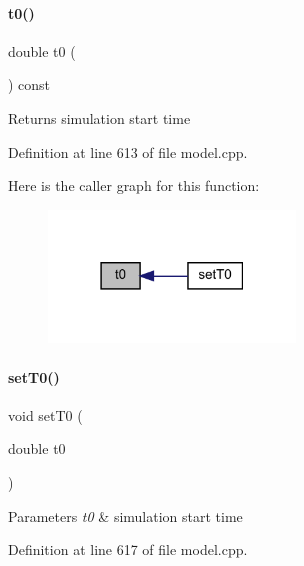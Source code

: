 \paragraph{\texorpdfstring{t0()}{t0()}}
{\footnotesize\ttfamily double t0 (\begin{DoxyParamCaption}{ }\end{DoxyParamCaption}) const}

\begin{DoxyReturn}{Returns}
simulation start time 
\end{DoxyReturn}


Definition at line 613 of file model.\+cpp.

Here is the caller graph for this function\+:
\nopagebreak
\begin{figure}[H]
\begin{center}
\leavevmode
\includegraphics[width=186pt]{classamici_1_1_model_a223e567004c82b5facc2fe98cdd16855_icgraph}
\end{center}
\end{figure}
\mbox{\label{classamici_1_1_model_aaf5053fde7e205c89d89c000a7693987}} 
\paragraph{\texorpdfstring{set\+T0()}{setT0()}}
{\footnotesize\ttfamily void set\+T0 (\begin{DoxyParamCaption}\item[{double}]{t0 }\end{DoxyParamCaption})}


\begin{DoxyParams}{Parameters}
{\em t0} & simulation start time \\
\hline
\end{DoxyParams}


Definition at line 617 of file model.\+cpp.

